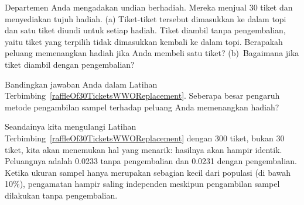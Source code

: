 \begin{exercisewrap}
\begin{nexercise} \label{raffleOf30TicketsWWOReplacement}
Departemen Anda mengadakan undian berhadiah. Mereka menjual 30 tiket dan menyediakan tujuh hadiah. (a) Tiket-tiket tersebut dimasukkan ke dalam topi dan satu tiket diundi untuk setiap hadiah. Tiket diambil tanpa pengembalian, yaitu tiket yang terpilih tidak dimasukkan kembali ke dalam topi. Berapakah peluang memenangkan hadiah jika Anda membeli satu tiket? (b)~Bagaimana jika tiket diambil dengan pengembalian?\footnotemark
\end{nexercise}
\end{exercisewrap}

\begin{exercisewrap}
\begin{nexercise} \label{followUpToRaffleOf30TicketsWWOReplacement}
Bandingkan jawaban Anda dalam Latihan Terbimbing~\ref{raffleOf30TicketsWWOReplacement}. Seberapa besar pengaruh metode pengambilan sampel terhadap peluang Anda memenangkan hadiah?\footnotemark
\end{nexercise}
\end{exercisewrap}

Seandainya kita mengulangi Latihan Terbimbing~\ref{raffleOf30TicketsWWOReplacement} dengan 300 tiket, bukan 30 tiket, kita akan menemukan hal yang menarik: hasilnya akan hampir identik. Peluangnya adalah 0.0233 tanpa pengembalian dan 0.0231 dengan pengembalian. Ketika ukuran sampel hanya merupakan sebagian kecil dari populasi (di bawah 10\%), pengamatan hampir saling independen meskipun pengambilan sampel dilakukan tanpa pengembalian.


